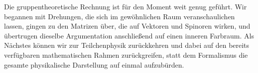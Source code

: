 Die gruppentheoretische Rechnung ist für den Moment weit genug geführt. Wir begannen mit Drehungen, die sich im gewöhnlichen Raum veranschaulichen lassen, gingen zu den Matrizen über, die auf Vektoren und Spinoren wirken, und übertrugen dieselbe Argumentation anschließend auf einen inneren Farbraum. Als Nächstes können wir zur Teilchenphysik zurückkehren und dabei auf den bereits verfügbaren mathematischen Rahmen zurückgreifen, statt dem Formalismus die gesamte physikalische Darstellung auf einmal aufzubürden.